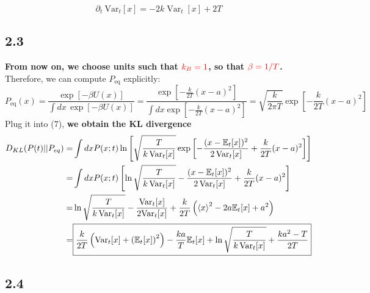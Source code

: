 \documentclass[11pt]{article}
\begin{document}
	\[
	\boxed{\partial_t\mathrm{~Var}_t[x]=-2k\operatorname{Var}_t[x]+2T}
	\]
	\subsection*{2.3}
\textbf{From now on, we choose units such that ${\color{red} k_B=1}$, so that $\color{red}\beta=1/T$.} Therefore, we can compute $P_{\mathrm{eq}}$ explicitly:
	\[
	P_{\mathrm{eq}}(x)=
	\frac{\exp[-\beta U(x)]}{\int dx\,\exp[-\beta U(x)]}=\frac{\exp\left[-\frac{k}{2T}\left(x-a\right)^2\right]}{\int dx \exp\left[-\frac{k}{2T}\left(x-a\right)^2\right]}=\sqrt{\frac{k}{2\pi T}}\exp\left[-\frac{k}{2T}\left(x-a\right)^2\right]
	\]
	Plug it into (7), \textbf{we obtain the KL divergence}
	\[
	\begin{aligned}
		D_{KL}(P(t)||P_{eq})=&\int dx  P(x;t)\ln\left[{\sqrt\frac{T}{k\,\mathrm{Var}_t[x]}}
		\exp\left[-\frac{(x-\mathbb{E}_t[x])^2}{2\,\mathrm{Var}_t[x]}+\frac{k}{2T}(x-a)^2\right]\right]\\
		=&\int dx P(x;t)\left[\ln {\sqrt\frac{T}{k\,\mathrm{Var}_t[x]}}-\frac{(x-\mathbb{E}_t[x])^2}{2\,\mathrm{Var}_t[x]}+\frac{k}{2T}(x-a)^2\right]\\
		=&\ln\sqrt{\frac{T}{k\,\mathrm{Var}_t[x]}}-\frac{\mathrm{Var}_t[x]}{2\mathrm{Var}_t[x]}+\frac{k}{2T}\left(\braket{x}^2-2a\mathbb{E}_t[x]+a^2\right)\\
		=&\boxed{
			\frac{k}{2T}\left(\mathrm{Var}_t[x]+\left(\mathbb{E}_t[x]\right)^2\right)-\frac{ka}{T}\mathbb{E}_t[x]+\ln\sqrt{\frac{T}{k\,\mathrm{Var}_t[x]}}+\frac{ka^2-T}{2T}
		}
	\end{aligned}
	\]
	
	\subsection*{2.4}
	
\end{document}
